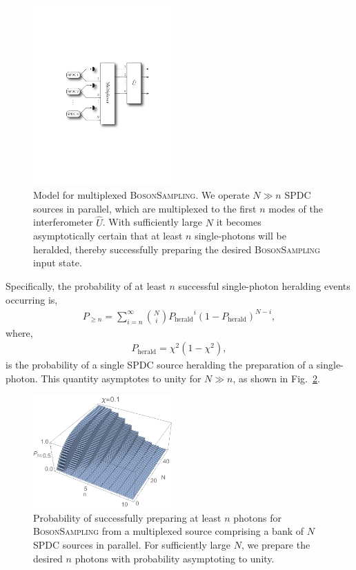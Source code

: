 \begin{figure}[!htbp]
\includegraphics[clip=true, width=0.475\textwidth]{multiplexed_boson_sampling}
\captionspacefig \caption{Model for multiplexed \textsc{BosonSampling}. We operate \mbox{$N\gg n$} SPDC sources in parallel, which are multiplexed to the first $n$ modes of the interferometer $\hat{U}$. With sufficiently large $N$ it becomes asymptotically certain that at least $n$ single-photons will be heralded, thereby successfully preparing the desired \textsc{BosonSampling} input state.} \label{fig:multiplexed_bs}
\end{figure}

Specifically, the probability of at least $n$ successful single-photon heralding events occurring is,
\begin{align}
P_{\geq n} = \sum_{i=n}^\infty \binom{N}{i} 	{P_\mathrm{herald}}^i (1-P_\mathrm{herald})^{N-i},
\end{align}
where,
\begin{align}
	P_\mathrm{herald} = \chi^2(1-\chi^2),
\end{align}
is the probability of a single SPDC source heralding the preparation of a single-photon. This quantity asymptotes to unity for \mbox{$N\gg n$}, as shown in Fig.~\ref{fig:multiplex_bs_res}.

\begin{figure}[!htbp]
\includegraphics[clip=true, width=0.475\textwidth]{multiplex_bs}
\captionspacefig \caption{Probability of successfully preparing at least $n$ photons for \textsc{BosonSampling} from a multiplexed source comprising a bank of $N$ SPDC sources in parallel. For sufficiently large $N$, we prepare the desired $n$ photons with probability asymptoting to unity.} \label{fig:multiplex_bs_res}
\end{figure}

